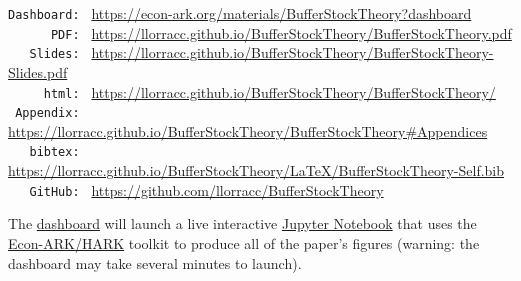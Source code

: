 \documentclass[BufferStockTheory]{subfiles}
\begin{document}
\hypertarget{links}{}
\begin{footnotesize}
  \parbox{\textwidth}{
    \begin{center}
      \begin{tabbing}
        \texttt{Dashboard:~} \= \= \url{https://econ-ark.org/materials/BufferStockTheory?dashboard} \\
        \texttt{~~~~~~PDF:~} \> \> \url{https://llorracc.github.io/BufferStockTheory/BufferStockTheory.pdf} \\
        \texttt{~~~Slides:~} \> \> \url{https://llorracc.github.io/BufferStockTheory/BufferStockTheory-Slides.pdf} \\
        \texttt{~~~~~html:~} \> \> \url{https://llorracc.github.io/BufferStockTheory/BufferStockTheory/}    \\
        \texttt{~Appendix:~} \> \> \url{https://llorracc.github.io/BufferStockTheory/BufferStockTheory\#Appendices}    \\
        \texttt{~~~bibtex:~} \> \> \url{https://llorracc.github.io/BufferStockTheory/LaTeX/BufferStockTheory-Self.bib}  \\
        \texttt{~~~GitHub:~} \> \> \url{https://github.com/llorracc/BufferStockTheory} \\
      \end{tabbing}
    \end{center}
    
    The \href{https://econ-ark.org/materials/BufferStockTheory?dashboard}{dashboard} will launch a live interactive \href{https://en.wikipedia.org/wiki/Project\_Jupyter\#Jupyter_Notebook}{Jupyter Notebook} that uses the \href{https://econ-ark/HARK}{Econ-ARK/HARK} toolkit to produce all of the paper's figures (warning: the dashboard may take several minutes to launch).
  } %
\end{footnotesize}

\begin{authorsinfo}
\end{authorsinfo}
\end{document}
